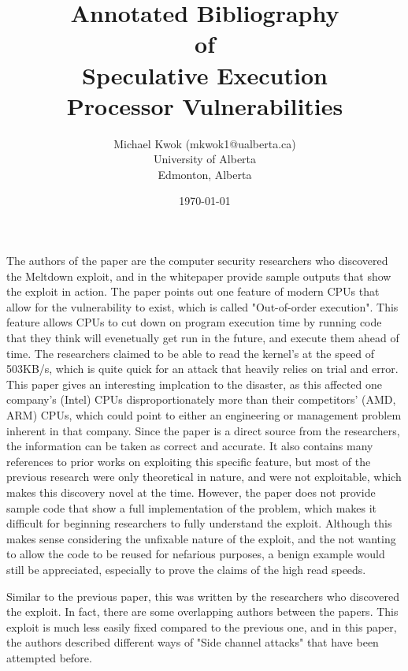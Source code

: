 \documentclass[10pt]{article}
\title{Annotated Bibliography \\ of \\ Speculative Execution \\ Processor Vulnerabilities}
\author{Michael Kwok (mkwok1@ualberta.ca) \\ University of Alberta \\ Edmonton, Alberta}
\date{\today}
\begin{document}
\maketitle

\cite{Meltdown} 

The authors of the paper are the computer security researchers who discovered
the Meltdown exploit, and in the whitepaper provide sample outputs that show
the exploit in action. The paper points out one feature of modern CPUs that allow
for the vulnerability to exist, which is called "Out-of-order execution". This
feature allows CPUs to cut down on program execution time by running code that
they think will evenetually get run in the future, and execute them ahead of
time. The researchers claimed to
be able to read the kernel's at the speed of 503KB/s, which is quite quick for an
attack that heavily relies on trial and error. This paper gives an interesting
implcation to the disaster, as this affected one company's (Intel) CPUs
disproportionately more than their competitors' (AMD, ARM) CPUs, which could
point to either an engineering or management problem inherent in that company.
Since the paper is a direct source from the researchers, the information can be
taken as correct and accurate. It also contains many references to prior works
on exploiting this specific feature, but most of the previous research were only
theoretical in nature, and were not exploitable, which makes this discovery
novel at the time. However, the paper does not provide sample code that show a
full implementation of the problem, which makes it difficult for beginning
researchers to fully understand the exploit. Although this makes sense considering
the unfixable nature of the exploit, and the not wanting to allow the code to be
reused for nefarious purposes, a benign example would still be appreciated, especially
to prove the claims of the high read speeds.


\cite{Spectre} 

Similar to the previous paper, this was written by the researchers who
discovered the exploit. In fact, there are some overlapping authors between the
papers. This exploit is much less easily fixed compared to the previous one, and
in this paper, the authors described different ways of "Side channel attacks"
that have been attempted before. 

\end{document}
